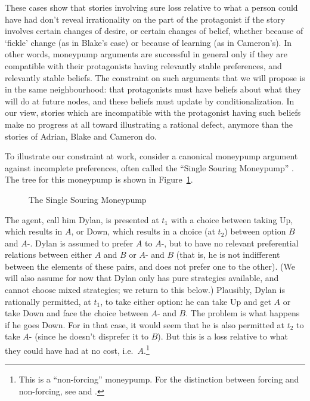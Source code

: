 \documentclass[
  11pt,
  letterpaper]{article}
\begin{document}
These cases show that stories involving sure loss relative to what a person could have had don't reveal irrationality on the part of the protagonist if the story involves certain changes of desire, or certain changes of belief, whether because of `fickle' change (as in Blake's case) \citep{Woodard2022} or because of learning (as in Cameron's). In other words, moneypump arguments are successful in general only if they are compatible with their protagonists having relevantly stable preferences, and relevantly stable beliefs. The constraint on such arguments that we will propose is in the same neighbourhood: that protagonists must have beliefs about what they will do at future nodes, and these beliefs must update by conditionalization. In our view, stories which are incompatible with the protagonist having such beliefs make no progress at all toward illustrating a rational defect, anymore than the stories of Adrian, Blake and Cameron do.

To illustrate our constraint at work, consider a canonical moneypump argument against incomplete preferences, often called the ``Single Souring Moneypump'' \citetext{\citealp{Chang1997intro}; \citealp[p.~26]{Gustafsson2022}}. The tree for this moneypump is shown in Figure~\ref{fig-single-souring}.

\begin{figure}

\centering{



}

\caption{\label{fig-single-souring}The Single Souring Moneypump}

\end{figure}

The agent, call him Dylan, is presented at $t_1$ with a choice between taking Up, which results in $A$, or Down, which results in a choice (at $t_2$) between option $B$ and $A$-. Dylan is assumed to prefer $A$ to $A$-, but to have no relevant preferential relations between either $A$ and $B$ or $A$- and $B$ (that is, he is not indifferent between the elements of these pairs, and does not prefer one to the other). (We will also assume for now that Dylan only has pure strategies available, and cannot choose mixed strategies; we return to this below.) Plausibly, Dylan is rationally permitted, at $t_1$, to take either option: he can take Up and get $A$ or take Down and face the choice between $A$- and $B$. The problem is what happens if he goes Down. For in that case, it would seem that he is also permitted at $t_2$ to take $A$- (since he doesn't disprefer it to $B$). But this is a loss relative to what they could have had at no cost, i.e.~$A$.\footnote{This is a ``non-forcing'' moneypump. For the distinction between forcing and non-forcing, see \citet[761-2]{GustafssonEspinoza2010} and \citet[27]{Gustafsson2022}.}
\end{document}
